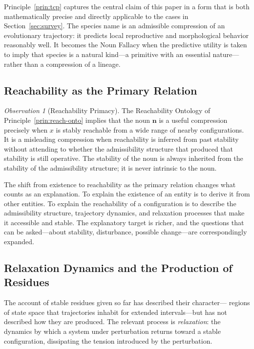 \documentclass[12pt, a4paper]{article}
\theoremstyle{plain}
\theoremstyle{definition}
\theoremstyle{remark}
\newtheorem{observation}[theorem]{Observation}
\begin{document}
Principle~\ref{prin:tcp} captures the central claim of this paper in a form
that is both mathematically precise and directly applicable to the cases
in Section~\ref{sec:survey}. The species name is an admissible compression
of an evolutionary trajectory: it predicts local reproductive and morphological
behavior reasonably well. It becomes the Noun Fallacy when the predictive
utility is taken to imply that species is a natural kind---a primitive with
an essential nature---rather than a compression of a lineage.

\subsection{Reachability as the Primary Relation}

\begin{observation}[Reachability Primacy]
\label{obs:primacy}
The Reachability Ontology of Principle~\ref{prin:reach-onto} implies that
the noun $\mathbf{n}$ is a useful compression precisely when $x$ is stably
reachable from a wide range of nearby configurations. It is a misleading
compression when reachability is inferred from past stability without
attending to whether the admissibility structure that produced that stability
is still operative. The stability of the noun is always inherited from the
stability of the admissibility structure; it is never intrinsic to the noun.
\end{observation}

The shift from existence to reachability as the primary relation changes what
counts as an explanation. To explain the existence of an entity is to derive
it from other entities. To explain the reachability of a configuration is to
describe the admissibility structure, trajectory dynamics, and relaxation
processes that make it accessible and stable. The explanatory target is richer,
and the questions that can be asked---about stability, disturbance, possible
change---are correspondingly expanded.

\subsection{Relaxation Dynamics and the Production of Residues}

The account of stable residues given so far has described their character---
regions of state space that trajectories inhabit for extended intervals---but
has not described how they are produced. The relevant process is
\emph{relaxation}: the dynamics by which a system under perturbation returns
toward a stable configuration, dissipating the tension introduced by the
perturbation.
\end{document}
